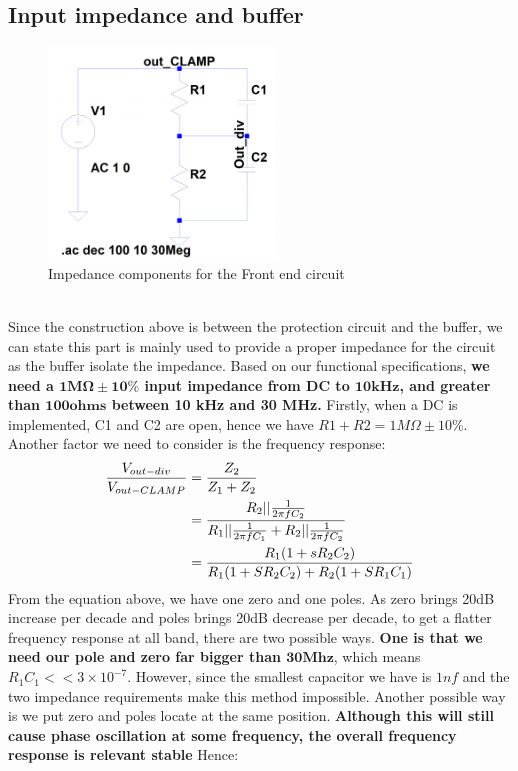 \documentclass[pdftex,12pt,a4paper]{article}
\begin{document}
\subsection{Input impedance and buffer}
\begin{figure}[H]
\centering
\includegraphics[width=6cm]{Input-imp.png}
\caption{Impedance components for the Front end circuit}
\end{figure}
~\\Since the construction above is between the protection circuit and the buffer, we can state this part is mainly used to provide a proper impedance for the circuit as the buffer isolate the impedance. Based on our functional specifications, \textbf{we need a $\mathbf{1M\Omega \pm 10\%}$ input impedance from DC to $\mathbf{10kHz}$, and greater than $\mathbf{100 ohms}$ between 10 kHz and 30 MHz. } Firstly, when a DC is implemented, C1 and C2 are open, hence we have $R1+R2=1M\Omega \pm 10\%$. Another factor we need to consider is the frequency response:
\begin{align}
\frac{V_{out-div}}{V_{out-CLAMP}}&=\frac{Z_2}{Z_1+Z_2}\\
&=\dfrac{R_2||\frac{1}{2\pi f C_2}}{R_1||\frac{1}{2\pi f C_1}+R_2||\frac{1}{2\pi f C_2}}\notag\\
&=\frac{R_1(1+sR_2C_2)}{R_1(1+SR_2C_2)+R_2(1+SR_1C_1)}\notag
\end{align} 
From the equation above, we have one zero and one poles. As zero brings 20dB increase per decade and poles brings 20dB decrease per decade, to get a flatter frequency response at all band, there are two possible ways. \textbf{One is that we need our pole and zero far bigger than $\mathbf{30Mhz}$}, which means $R_1C_1<<3\times 10^{-7}$. However, since the smallest capacitor we have is $1nf$ and the two impedance requirements make this method impossible. Another possible way is we put zero and poles locate at the same position. \textbf{Although this will still cause phase oscillation at some frequency, the overall frequency response is relevant stable} Hence:
\end{document}
